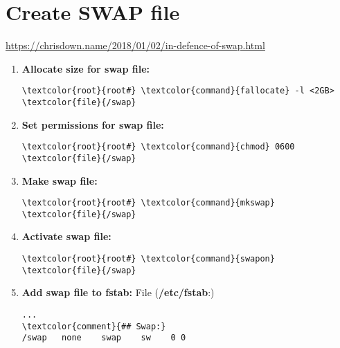 \documentclass[10pt, a4paper, onecolumn, openany]{book} %
\begin{document}
\section{Create SWAP file}
\underline{\href{https://chrisdown.name/2018/01/02/in-defence-of-swap.html}{https://chrisdown.name/2018/01/02/in-defence-of-swap.html}}
\begin{enumerate}
    \item \textbf{Allocate size for swap file:}
\begin{Verbatim}[commandchars=\\\{\}]
\textcolor{root}{root#} \textcolor{command}{fallocate} -l <2GB> \textcolor{file}{/swap}
\end{Verbatim}
        \item \textbf{Set permissions for swap file:}
\begin{Verbatim}[commandchars=\\\{\}]
\textcolor{root}{root#} \textcolor{command}{chmod} 0600 \textcolor{file}{/swap}
\end{Verbatim}
    \item \textbf{Make swap file:}
\begin{Verbatim}[commandchars=\\\{\}]
\textcolor{root}{root#} \textcolor{command}{mkswap} \textcolor{file}{/swap}
\end{Verbatim}
    \item \textbf{Activate swap file:}
\begin{Verbatim}[commandchars=\\\{\}]
\textcolor{root}{root#} \textcolor{command}{swapon} \textcolor{file}{/swap}
\end{Verbatim}
    \item \textbf{Add swap file to fstab:}
\newline File (\textbf{\textcolor{file}{/etc/fstab}}:)    
\begin{Verbatim}[commandchars=\\\{\}]
...
\textcolor{comment}{## Swap:}
/swap   none    swap    sw    0 0
\end{Verbatim}
\end{enumerate}
\end{document}
